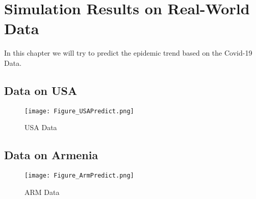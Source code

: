 \section{Simulation Results on Real-World Data}\label{Real_world}\thispagestyle{SectionFirstPage} %
In this chapter we will try to predict the epidemic trend based on the Covid-19 Data.

\subsection{Data on USA}\label{USA}
\begin{figure}[H]
	\caption{USA Data}
	\centering
	\texttt{[image: Figure\_USAPredict.png]}
\end{figure}


\subsection{Data on Armenia}\label{ARM}
\begin{figure}[H]
	\caption{ARM Data}
	\centering
	\texttt{[image: Figure\_ArmPredict.png]}
\end{figure}

